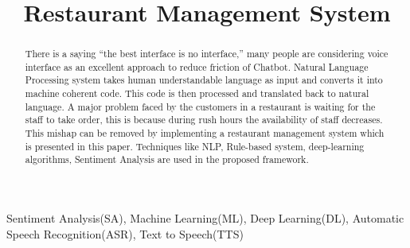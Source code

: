 \documentclass[conference]{IEEEtran}
\begin{document}
 \title{Restaurant Management System}
\author{
	\and
	\and
	}
\maketitle
 
 
\begin{abstract}
There is a saying “the best interface is no interface,” many people are considering voice interface as an excellent approach to reduce friction of Chatbot. Natural Language Processing system takes human understandable language as input and converts it into machine coherent code. This code is then processed and translated back to natural language. A major problem faced by the customers in a restaurant is waiting for the staff to take order, this is because during rush hours the availability of staff decreases. This mishap can be removed by implementing a restaurant management system which is presented in this paper. Techniques like NLP, Rule-based system, deep-learning algorithms, Sentiment Analysis are used in the proposed framework.\\
\end{abstract}
\begin{IEEEkeywords}
	Sentiment Analysis(SA), Machine Learning(ML), Deep Learning(DL), Automatic Speech Recognition(ASR), Text to Speech(TTS)
\end{IEEEkeywords}
\end{document}
